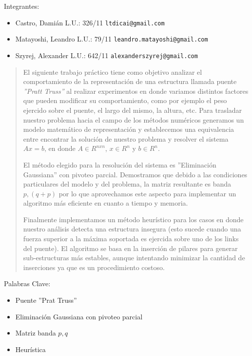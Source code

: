 Integrantes:
\begin{itemize}
	\item Castro, Dami\'an L.U.: 326/11  \verb+ltdicai@gmail.com+
	\item Matayoshi, Leandro L.U.: 79/11 \verb+leandro.matayoshi@gmail.com+
	\item Szyrej, Alexander L.U.: 642/11   \verb+alexanderszyrej@gmail.com+
	
\end{itemize}

\vspace{0.5cm}

\begin{abstract} 
	El siguiente trabajo práctico tiene como objetivo analizar el comportamiento de la representación de una estructura 
llamada
puente \emph{''Pratt Truss''} al realizar experimentos en donde variamos distintos factores que pueden modificar su
comportamiento, como por ejemplo el peso ejercido sobre el puente, el largo del mismo, la altura, etc. Para trasladar
nuestro problema hacia el campo de los métodos numéricos generamos un modelo matemático de
representación y establecemos una equivalencia entre encontrar la solución de nuestro problema y resolver el sistema
$Ax = b$, en donde $A \in R^{nxn}$, $x \in R^{n}$ y $b \in R^{n}$.

	El método elegido para la resolución del sistema es ''Eliminación Gaussiana'' con pivoteo parcial.
Demostramos que debido a las condiciones particulares del modelo y del problema,
	 la matriz resultante es banda $p,(q+p)$ por lo
que aprovechamos este aspecto para implementar un algoritmo más eficiente en cuanto a tiempo y memoria. 

	Finalmente implementamos un método heurístico para los casos en donde nuestro análisis detecta una estructura
insegura (esto sucede cuando una fuerza superior a la máxima soportada es ejercida sobre uno de los links del puente).
El algoritmo se basa en la inserción de pilares para generar sub-estructuras más estables, aunque intentando minimizar
la cantidad de inserciones ya que es un procedimiento costoso.
\end{abstract}

\vspace{0.5cm}

Palabras Clave:
\begin{itemize}
	\item Puente ''Prat Truss''
	\item Eliminación Gaussiana con pivoteo parcial	
	\item Matriz banda $p,q$
	\item Heurística
\end{itemize}

